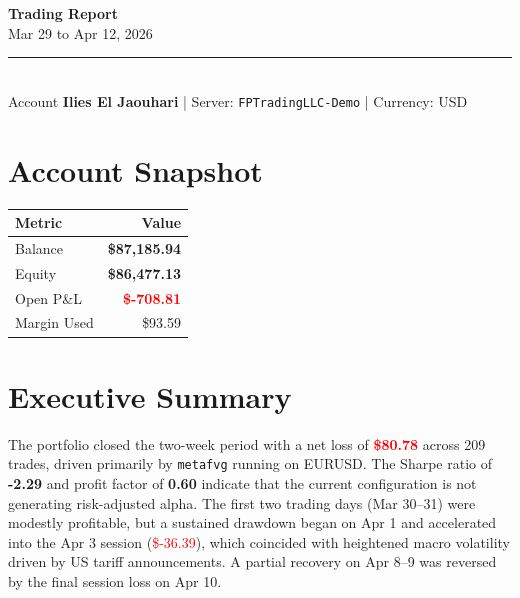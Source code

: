 \documentclass[11pt,a4paper]{article}
\begin{document}
\begin{center}
  {\Huge\bfseries\color{textcol} Trading Report}\\[6pt]
  {\large\color{muted} Mar 29 to Apr 12, 2026}\\[10pt]
  \color{muted}\rule{0.6\linewidth}{0.4pt}\\[6pt]
  {\normalsize
    Account \textbf{\color{textcol}Ilies El Jaouhari}
    \quad|\quad
    Server: \texttt{\color{blue}FPTradingLLC-Demo}
    \quad|\quad
    Currency: USD
  }
\end{center}

\vspace{8pt}

\section{Account Snapshot}

\begin{tabularx}{0.55\linewidth}{L R}
  \toprule
  \textbf{Metric} & \textbf{Value} \\
  \midrule
   Balance    & \textbf{\$87,185.94} \\
   Equity     & \textbf{\$86,477.13} \\
   Open P\&L  & \textcolor{red}{\textbf{\$-708.81}} \\
   Margin Used & \$93.59 \\
  \bottomrule
\end{tabularx}

\section{Executive Summary}

The portfolio closed the two-week period with a net loss of \textcolor{red}{\textbf{\$80.78}} across 209 trades, driven primarily by \texttt{metafvg} running on EURUSD. The Sharpe ratio of \textbf{-2.29} and profit factor of \textbf{0.60} indicate that the current configuration is not generating risk-adjusted alpha. The first two trading days (Mar 30--31) were modestly profitable, but a sustained drawdown began on Apr 1 and accelerated into the Apr 3 session (\textcolor{red}{\$-36.39}), which coincided with heightened macro volatility driven by US tariff announcements. A partial recovery on Apr 8--9 was reversed by the final session loss on Apr 10.
\end{document}
